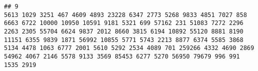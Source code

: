\documentclass{article}\usepackage[]{graphicx}\usepackage[]{color}
\makeatletter
\newenvironment{kframe}{%
 \def\at@end@of@kframe{}%
 \ifinner\ifhmode%
  \def\at@end@of@kframe{\end{minipage}}%
  \begin{minipage}{\columnwidth}%
 \fi\fi%
 \def\FrameCommand##1{\hskip\@totalleftmargin \hskip-\fboxsep
 \colorbox{shadecolor}{##1}\hskip-\fboxsep
     \hskip-\linewidth \hskip-\@totalleftmargin \hskip\columnwidth}%
 \MakeFramed {\advance\hsize-\width
   \@totalleftmargin\z@ \linewidth\hsize
   \@setminipage}}%
 {\par\unskip\endMakeFramed%
 \at@end@of@kframe}
\newenvironment{knitrout}{}{} %
\makeatother
\begin{document}
\begin{knitrout}
\begin{kframe}
\begin{verbatim}
## 9                                                                                                                                                                                                                                                                                                                                                                                                                                                                                                                                                                                                                                                                                                                                                                                                                                                                                                                                                                                                                                                            5613 1029 3251 467 4609 4893 23228 6347 2773 5268 9833 4851 7027 858 6663 6722 10000 10950 10591 9181 5321 699 57162 231 51083 7272 2296 2263 2305 55704 6624 9837 2012 8660 3815 6194 10892 55120 8881 8190 11151 6355 9839 1871 56992 10855 5771 5743 2213 8877 6374 5585 3868 5134 4478 1063 6777 2001 5610 5292 2534 4089 701 259266 4332 4690 2869 54962 4067 2146 5578 9133 3569 85453 6277 5270 56950 79679 996 991 1535 2919
\end{verbatim}
\end{kframe}
\end{knitrout}
\end{document}
